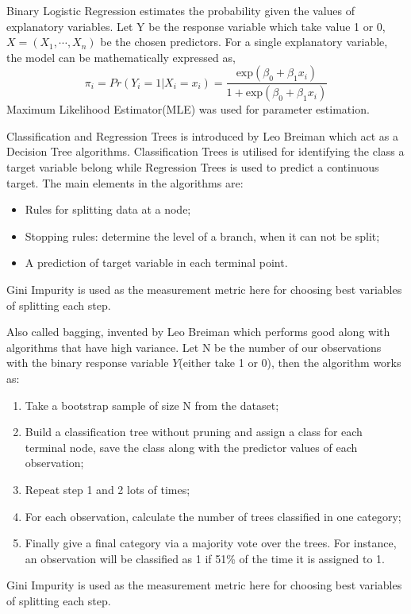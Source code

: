 \begin{defn}\label{Definition of Logistic Regression}
Binary Logistic Regression estimates the probability given the values of explanatory variables. Let Y be the response variable which take value 1 or 0, $X=(X_1,\cdots,X_n)$ be the chosen predictors. For a single explanatory variable, the model can be mathematically expressed as,
\begin{equation}
\pi_i=Pr(Y_i=1|X_i=x_i)=\dfrac{\text{exp}(\beta_0+\beta_1 x_i)}{1+\text{exp}(\beta_0+\beta_1 x_i)}
\end{equation}
Maximum Likelihood Estimator(MLE) was used for parameter estimation.
\end{defn}

\begin{defn}\label{Definition of Classification Tree}
Classification and Regression Trees is introduced by Leo Breiman which act as a Decision Tree algorithms. Classification Trees is utilised for identifying the class a target variable belong while Regression Trees is used to predict a continuous target. The main elements in the algorithms are:
\begin{itemize}
   \item Rules for splitting data at a node; 
   \item Stopping rules: determine the level of a branch, when it can not be split;
   \item A prediction of target variable in each terminal point.
\end{itemize}
Gini Impurity is used as the measurement metric here for choosing best variables of splitting each step. 
\end{defn}

\begin{defn}\label{Definition of Bagging}
Also called bagging, invented by Leo Breiman which performs good along with algorithms that have high variance. Let N be the number of our observations with the binary response variable $Y$(either take 1 or 0), then the algorithm works as: 
\begin{enumerate}
   \item Take a bootstrap sample of size N from the dataset;
   \item Build a classification tree without pruning and assign a class for each terminal node, save the class along with the predictor values of each observation;
   \item Repeat step 1 and 2 lots of times;
   \item For each observation, calculate the number of trees classified in one category;
   \item Finally give a final category via a majority vote over the trees. For instance, an observation will be classified as 1 if 51\% of the time it is assigned to 1. 
\end{enumerate}
Gini Impurity is used as the measurement metric here for choosing best variables of splitting each step. 
\end{defn}

